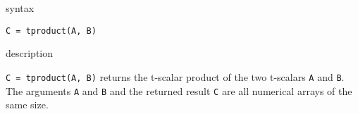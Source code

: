 \documentclass[12pt,reqno]{amsart}
\numberwithin{equation}{section}
\numberwithin{figure}{section}
\numberwithin{table}{section}
\theoremstyle{definition}
\begin{document}


\noindent
{\color{red} \sc syntax}

\begin{verbatim}
C = tproduct(A, B)
\end{verbatim}






%



\noindent
{\color{red} \sc description}

{\tt{}C = tproduct(A, B)} returns the t-scalar product of the two t-scalars {\tt A} and {\tt B}.
The arguments {\tt A} and {\tt B} and the returned result {\tt C} are all numerical arrays of the same size. 








%
%
\end{document}
